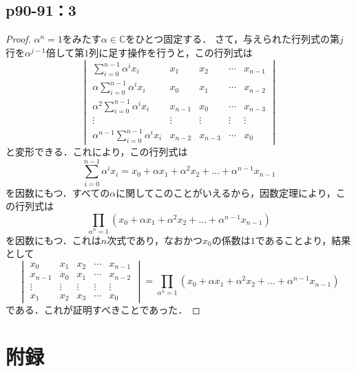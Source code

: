 \documentclass[uplatex,dvipdfmx,a4paper,10pt,fleqn]{jsarticle}
\begin{document}
\newpage 


\subsection*{p90-91：3}

\begin{leftbar}
    \begin{proof}
    $\alpha ^n =1$をみたす$\alpha \in \mathbb{C}$をひとつ固定する．
    さて，与えられた行列式の第$j$行を$\alpha^{j-1}$倍して第$1$列に足す操作を行うと，この行列式は
    \[
        \begin{vmatrix}
            \sum_{i=0}^{n-1} \alpha^i x_i & x_1 & x_2 & \cdots & x_{n-1} \\
            \alpha \sum_{i=0}^{n-1} \alpha^i x_i & x_0 & x_1 & \cdots & x_{n-2} \\
            \alpha^2 \sum_{i=0}^{n-1} \alpha^i x_i & x_{n-1} & x_0 & \cdots & x_{n-3} \\
            \vdots & \vdots & \vdots & \vdots & \vdots  \\
            \alpha^{n-1} \sum_{i=0}^{n-1} \alpha^i x_i & x_{n-2} & x_{n-3} & \cdots & x_0 
        \end{vmatrix}
    \]
    と変形できる．これにより，この行列式は
    \[
        \sum_{i=0}^{n-1} \alpha^i x_i = x_0 + \alpha x_1 + \alpha^2 x_2 + \dots +\alpha^{n-1} x_{n-1}
    \]
    を因数にもつ．すべての$\alpha$に関してこのことがいえるから，因数定理により，この行列式は
    \[
        \prod_{\alpha^n=1} (x_0 + \alpha x_1 + \alpha^2 x_2 + \dots +\alpha^{n-1} x_{n-1})
    \]
を因数にもつ．これは$n$次式であり，なおかつ$x_0$の係数は$1$であることより，結果として
\[
   \begin{vmatrix} 
    x_0 & x_1 & x_2 & \cdots & x_{n-1} \\
    x_{n-1} & x_0 & x_1 & \cdots & x_{n-2} \\
    \vdots & \vdots & \vdots & \vdots & \vdots \\
    x_1 & x_2 & x_3 & \cdots & x_0 
   \end{vmatrix} 
   =  \prod_{\alpha^n=1} (x_0 + \alpha x_1 + \alpha^2 x_2 + \dots +\alpha^{n-1} x_{n-1})
\]
である．これが証明すべきことであった．
\end{proof}
\end{leftbar}

\newpage 

\section*{附録\three}
\end{document}
